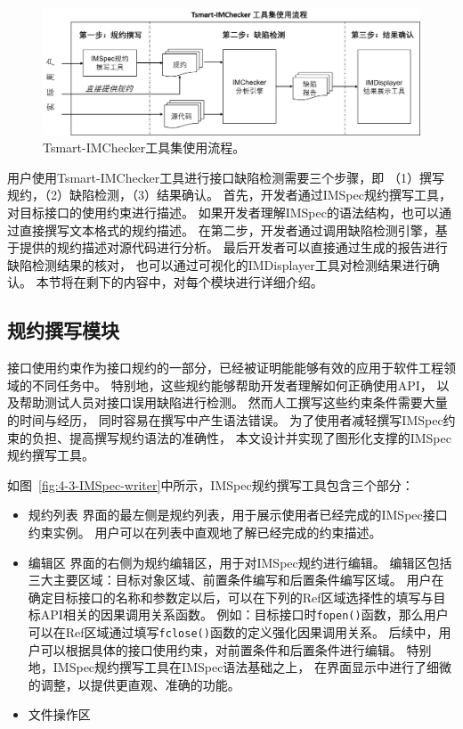 \begin{figure}[t]
	\centering
	\includegraphics[width=0.85\linewidth]{figures/cp4-overview.png}
	\caption{
		Tsmart-IMChecker工具集使用流程。
	}
	\label{fig:4-3-overview}
\end{figure}

用户使用Tsmart-IMChecker工具进行接口缺陷检测需要三个步骤，即
（1）撰写规约，（2）缺陷检测，（3）结果确认。
首先，开发者通过IMSpec规约撰写工具，对目标接口的使用约束进行描述。
如果开发者理解IMSpec的语法结构，也可以通过直接撰写文本格式的规约描述。
在第二步，开发者通过调用缺陷检测引擎，基于提供的规约描述对源代码进行分析。
最后开发者可以直接通过生成的报告进行缺陷检测结果的核对，
也可以通过可视化的IMDisplayer工具对检测结果进行确认。
本节将在剩下的内容中，对每个模块进行详细介绍。



\subsection{规约撰写模块}
接口使用约束作为接口规约的一部分，已经被证明能能够有效的应用于软件工程领域的不同任务中。
特别地，这些规约能够帮助开发者理解如何正确使用API，
以及帮助测试人员对接口误用缺陷进行检测。
然而人工撰写这些约束条件需要大量的时间与经历，
同时容易在撰写中产生语法错误。
为了使用者减轻撰写IMSpec约束的负担、提高撰写规约语法的准确性，
本文设计并实现了图形化支撑的IMSpec规约撰写工具。

如图~\ref{fig:4-3-IMSpec-writer}中所示，IMSpec规约撰写工具包含三个部分：
\begin{itemize}
	\item {\kaishu 规约列表}
	界面的最左侧是规约列表，用于展示使用者已经完成的IMSpec接口约束实例。
	用户可以在列表中直观地了解已经完成的约束描述。
	\item {\kaishu 编辑区} 
	界面的右侧为规约编辑区，用于对IMSpec规约进行编辑。
	编辑区包括三大主要区域：目标对象区域、前置条件编写和后置条件编写区域。
	用户在确定目标接口的名称和参数定以后，可以在下列的Ref区域选择性的填写与目标API相关的因果调用关系函数。
	例如：目标接口时\texttt{fopen()}函数，那么用户可以在Ref区域通过填写\texttt{fclose()}函数的定义强化因果调用关系。
	后续中，用户可以根据具体的接口使用约束，对前置条件和后置条件进行编辑。
	特别地，IMSpec规约撰写工具在IMSpec语法基础之上，
	在界面显示中进行了细微的调整，以提供更直观、准确的功能。
	\item {\kaishu 文件操作区} 
\end{itemize}

